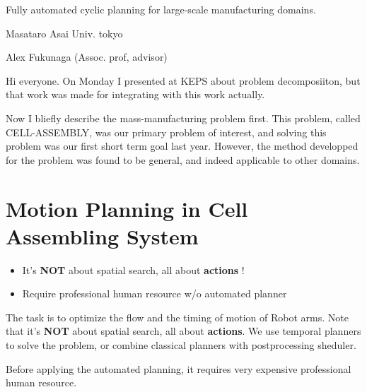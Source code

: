 \begin{outline-text-1}
\begin{xlarge}
\begin{center}
Fully automated cyclic planning for
large-scale manufacturing domains.
\end{center}
\end{xlarge}

\begin{center}
\begin{smaller}
Masataro Asai Univ. tokyo

Alex Fukunaga (Assoc. prof, advisor)
\end{smaller}
\end{center}

\begin{resume}
Hi everyone. On Monday I presented at KEPS about
problem decomposiiton, but that work was made
for integrating with this work actually.

Now I bliefly describe the mass-manufacturing problem first.
This problem, called CELL-ASSEMBLY, was our primary problem of interest, and
solving this problem was our first short term goal last year.
However, the method developped for the problem was found to be general, and indeed
applicable to other domains.
\end{resume}
\end{outline-text-1}

\section{Motion Planning in Cell Assembling System}
\label{sec-1}

\begin{itemize}
\item It's \textbf{NOT} about spatial search, all about \textbf{actions} !
\item Require professional human resource w/o automated planner
\end{itemize}

\begin{resume}
The task is to
optimize the flow and the timing of motion of Robot arms.
Note that it's \textbf{NOT} about spatial search, all about \textbf{actions}.
We use temporal planners to solve the problem, or
combine classical planners with postprocessing sheduler.

Before applying the automated planning,
it requires very expensive professional human resource.
\end{resume}


